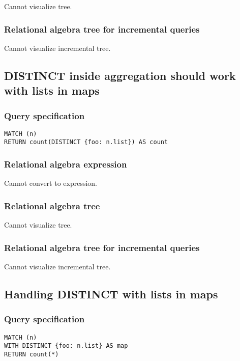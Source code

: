 Cannot visualize tree.

\subsubsection*{Relational algebra tree for incremental queries}

Cannot visualize incremental tree.

\subsection{DISTINCT inside aggregation should work with lists in maps}

\subsubsection*{Query specification}

\begin{lstlisting}
MATCH (n)
RETURN count(DISTINCT {foo: n.list}) AS count
\end{lstlisting}

\subsubsection*{Relational algebra expression}

Cannot convert to expression.

\subsubsection*{Relational algebra tree}

Cannot visualize tree.

\subsubsection*{Relational algebra tree for incremental queries}

Cannot visualize incremental tree.

\subsection{Handling DISTINCT with lists in maps}

\subsubsection*{Query specification}

\begin{lstlisting}
MATCH (n)
WITH DISTINCT {foo: n.list} AS map
RETURN count(*)
\end{lstlisting}

